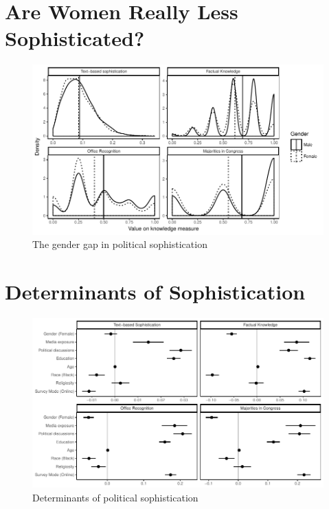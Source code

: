 \documentclass[12pt]{article}
\begin{document}
\section*{Are Women Really Less Sophisticated?}

\begin{figure}[h]\centering
\includegraphics{../fig/densities.pdf}
\caption{The gender gap in political sophistication}\label{fig:densities}
\end{figure}


\section*{Determinants of Sophistication}

\begin{figure}[h]\centering
\includegraphics{../fig/determinants.pdf}
\caption{Determinants of political sophistication}\label{fig:determinants}
\end{figure}
\end{document}
